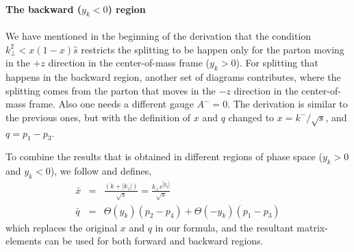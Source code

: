 \paragraph{The backward ($y_k < 0$) region}
We have mentioned in the beginning of the derivation that the condition $k_\perp^2 < x(1-x)\hat{s}$ restricts the splitting to be happen only for the parton moving in the $+z$ direction in the center-of-mass frame ($y_k > 0$).
For splitting that happens in the backward region, another set of diagrams contributes, where the splitting comes from the parton that moves in the $-z$ direction in the center-of-mass frame.
Also one needs a different gauge $A^- = 0$.
The derivation is similar to the previous ones, but with the definition of $x$ and $q$ changed to $x = k^-/\sqrt{s}$, and $q = p_1-p_3$.

To combine the results that is obtained in different regions of phase space ($y_k > 0$ and $y_k < 0$), we follow \cite{Fochler:2013epa} and defines,
\begin{eqnarray}
\bar{x} &=& \frac{(k + |k_z|)}{\sqrt{s}} = \frac{k_\perp e^{|y_k|}}{\sqrt{s}}\\ 
\bar{q} &=& \Theta(y_k)(p_2-p_4) + \Theta(-y_k)(p_1-p_3)
\end{eqnarray}
which replaces the original $x$ and $q$ in our formula, and the resultant matrix-elements can be used for both forward and backward regions.

